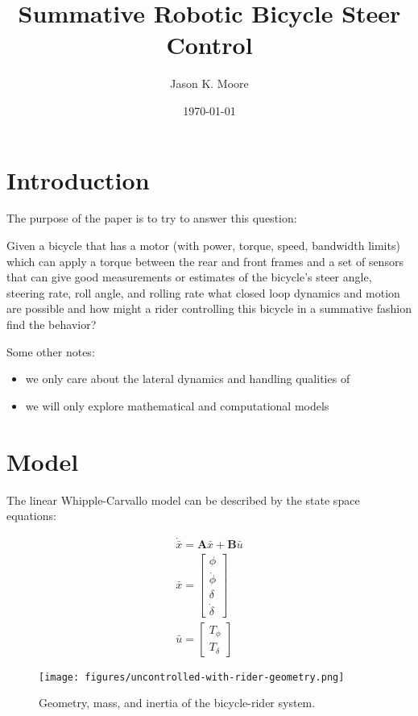 \documentclass[12pt]{article}
\title{Summative Robotic Bicycle Steer Control}
\author{Jason K. Moore}
\date{\today}
\begin{document}
\maketitle

\section{Introduction}

The purpose of the paper is to try to answer this question:

Given a bicycle that has a motor (with power, torque, speed, bandwidth limits)
which can apply a torque between the rear and front frames and a set of sensors
that can give good measurements or estimates of the bicycle's steer angle,
steering rate, roll angle, and rolling rate what closed loop dynamics and
motion are possible and how might a rider controlling this bicycle in a
summative fashion find the behavior?

Some other notes:

\begin{itemize}
  \item we only care about the lateral dynamics and handling qualities of
  \item we will only explore mathematical and computational models
\end{itemize}

\section{Model}

The linear Whipple-Carvallo model can be described by the state space
equations:

\begin{align}
  \dot{\bar{x}} = \mathbf{A} \bar{x} + \mathbf{B} \bar{u} \\
  \bar{x} = \begin{bmatrix} \phi \\ \dot{\phi} \\ \delta \\ \dot{\delta}
  \end{bmatrix} \\
  \bar{u} = \begin{bmatrix} T_{\phi} \\ T_{\delta} \end{bmatrix}
\end{align}

\begin{figure}
  \centering
  \texttt{[image: figures/uncontrolled-with-rider-geometry.png]}
  \caption{Geometry, mass, and inertia of the bicycle-rider system.}
  \label{fig:uncontrolled-with-rider-geometry}
\end{figure}
\end{document}
